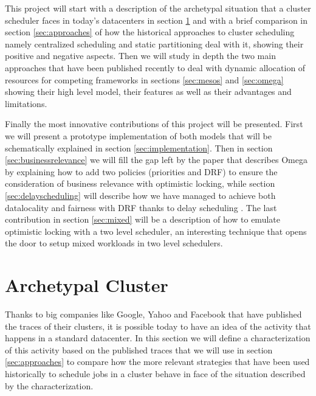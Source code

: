 \documentclass{report}                     %
\begin{document}

This project will start with a description of the archetypal situation
that a cluster scheduler faces in today's datacenters in section
\ref{sec:archetype} and with a brief comparison in section
\ref{sec:approaches} of how the historical approaches to cluster
scheduling namely centralized scheduling and static partitioning deal
with it, showing their positive and negative aspects. Then we will
study in depth the two main approaches that have been published
recently to deal with dynamic allocation of resources for competing
frameworks in sections \ref{sec:mesos} and \ref{sec:omega} showing
their high level model, their features as well as their advantages and
limitations. 

Finally the most innovative contributions of this project will be
presented. First we will present a prototype implementation of both
models that will be schematically explained in section
\ref{sec:implementation}. Then in section \ref{sec:businessrelevance}
we will fill the gap left by the paper that describes Omega by
explaining how to add two policies (priorities and DRF) to ensure the
consideration of business relevance with optimistic locking, while
section \ref{sec:delayscheduling} will describe how we have managed to
achieve both datalocality and fairness with DRF thanks to delay
scheduling \cite{zaharia_delay_2010}. The last contribution in section
\ref{sec:mixed} will be a description of how to emulate optimistic
locking with a two level scheduler, an interesting technique that
opens the door to setup mixed workloads in two level schedulers.




\chapter{Archetypal Cluster}
\label{sec:archetype}

Thanks to big companies like Google, Yahoo and Facebook that
have published the traces of their clusters, it is possible today to
have an idea of the activity that happens in a standard datacenter.
In this section we will define a characterization of this activity based on
the published traces that we will use in section \ref{sec:approaches} to 
compare how the more relevant strategies that have been used historically
to schedule jobs in a cluster behave in face of the situation described
by the characterization.
\end{document}
